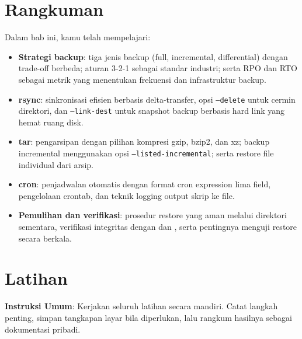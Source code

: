 \section{Rangkuman}
\label{sec:backup-summary}

Dalam bab ini, kamu telah mempelajari:

\begin{itemize}[noitemsep,topsep=2pt]
    \item \textbf{Strategi backup}: tiga jenis backup (full, incremental,
        differential) dengan trade-off berbeda; aturan 3-2-1 sebagai standar
        industri; serta RPO dan RTO sebagai metrik yang menentukan frekuensi
        dan infrastruktur backup.
    \item \textbf{rsync}: sinkronisasi efisien berbasis delta-transfer, opsi
        \texttt{--delete} untuk cermin direktori, dan \texttt{--link-dest} untuk
        snapshot backup berbasis hard link yang hemat ruang disk.
    \item \textbf{tar}: pengarsipan dengan pilihan kompresi gzip, bzip2, dan xz;
        backup incremental menggunakan opsi \texttt{--listed-incremental};
        serta restore file individual dari arsip.
    \item \textbf{cron}: penjadwalan otomatis dengan format cron expression lima
        field, pengelolaan crontab, dan teknik logging output skrip ke file.
    \item \textbf{Pemulihan dan verifikasi}: prosedur restore yang aman melalui
        direktori sementara, verifikasi integritas dengan  dan
        , serta pentingnya menguji restore secara berkala.
\end{itemize}

\section{Latihan}
\label{sec:latihan-backup}

\textbf{Instruksi Umum}: Kerjakan seluruh latihan secara mandiri. Catat langkah penting, simpan tangkapan layar bila diperlukan, lalu rangkum hasilnya sebagai dokumentasi pribadi.

